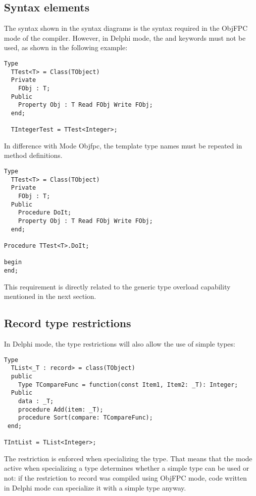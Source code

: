 \subsection{Syntax elements}
The syntax shown in the syntax diagrams is the syntax required in the ObjFPC mode of the compiler.
However, in Delphi mode, the  and  keywords must not be used, as shown in the following example:
\begin{verbatim}
Type
  TTest<T> = Class(TObject)
  Private
    FObj : T;
  Public
    Property Obj : T Read FObj Write FObj;
  end;

  TIntegerTest = TTest<Integer>;
\end{verbatim}
In difference with Mode Objfpc, the template type names must be repeated in method definitions. 
\begin{verbatim}
Type
  TTest<T> = Class(TObject)
  Private
    FObj : T;
  Public
    Procedure DoIt;
    Property Obj : T Read FObj Write FObj;
  end;

Procedure TTest<T>.DoIt;

begin
end;
\end{verbatim}
This requirement is directly related to the generic type overload capability mentioned in the next section.

\subsection{Record type restrictions}
In Delphi mode, the  type restrictions will also allow the use of simple types:
\begin{verbatim}
Type
  TList<_T : record> = class(TObject)
  public 
    Type TCompareFunc = function(const Item1, Item2: _T): Integer;
  Public  
    data : _T;
    procedure Add(item: _T);
    procedure Sort(compare: TCompareFunc);
 end;

TIntList = TList<Integer>;
\end{verbatim}
The restriction is enforced when specializing the type. That means that the
mode active when specializing a type determines whether a simple type can be
used or not: if the restriction to record was compiled using ObjFPC mode,
code written in Delphi mode can specialize it with a simple type anyway.

